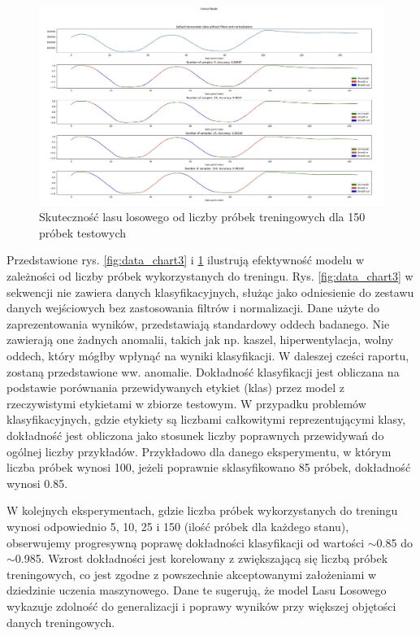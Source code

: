 \documentclass{article}
\begin{document}
\begin{figure}[H]
    \centering
    \includegraphics[width=\textwidth]{jak_sobie_radzi_las_losowy_2.png}
    \caption{Skuteczność lasu losowego od liczby próbek treningowych dla 150 próbek testowych}
    \label{fig:data_chart4}
\end{figure}

Przedstawione rys. \ref{fig:data_chart3} i \ref{fig:data_chart4} ilustrują efektywność modelu w zależności od liczby próbek wykorzystanych do treningu. Rys. \ref{fig:data_chart3} w sekwencji nie zawiera danych klasyfikacyjnych, służąc jako odniesienie do zestawu danych wejściowych bez zastosowania filtrów i normalizacji. Dane użyte do zaprezentowania wyników, przedstawiają standardowy oddech badanego. Nie zawierają one żadnych anomalii, takich jak np. kaszel, hiperwentylacja, wolny oddech, który mógłby wpłynąć na wyniki klasyfikacji. W daleszej cześci raportu, zostaną przedstawione ww. anomalie. Dokładność klasyfikacji jest obliczana na podstawie porównania przewidywanych etykiet (klas) przez model z rzeczywistymi etykietami w zbiorze testowym. W przypadku problemów klasyfikacyjnych, gdzie etykiety są liczbami całkowitymi reprezentującymi klasy, dokładność jest obliczona jako stosunek liczby poprawnych przewidywań do ogólnej liczby przykładów. Przykładowo dla danego eksperymentu, w którym liczba próbek wynosi 100, jeżeli poprawnie sklasyfikowano 85 próbek, dokładność wynosi 0.85.


W kolejnych eksperymentach, gdzie liczba próbek wykorzystanych do treningu wynosi odpowiednio 5, 10, 25 i 150 (ilość próbek dla każdego stanu), obserwujemy progresywną poprawę dokładności klasyfikacji od wartości $\sim$0.85 do $\sim$0.985. Wzrost dokładności jest korelowany z zwiększającą się liczbą próbek treningowych, co jest zgodne z powszechnie akceptowanymi założeniami w dziedzinie uczenia maszynowego. Dane te sugerują, że model Lasu Losowego wykazuje zdolność do generalizacji i poprawy wyników przy większej objętości danych treningowych.
\end{document}

